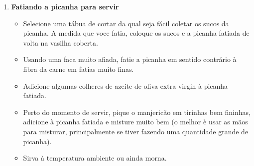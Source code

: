 \documentclass [11pt, letterpaper] {article}
\newcommand \fileName {SlicedGrilledBeef}
\begin{document}
\begin{description}
\begin{enumerate}
\begin{itemize}
	\end{itemize}
	\item {\bf Fatiando a picanha para servir}
	\begin{itemize}
        		\item Selecione uma t\'abua de cortar da qual seja f\'acil coletar os sucos da picanha. A medida que voce fatia, coloque os sucos e a picanha fatiada de volta na vasilha coberta.
		\item Usando uma faca muito afiada, fatie a picanha em sentido contr\'ario \`a fibra da carne em fatias muito finas. 
		\item Adicione algumas colheres de azeite de oliva extra virgin \`a picanha fatiada.
		\item Perto do momento de servir, pique o manjeric\~ao em tirinhas bem fininhas, adicione \`a picanha fatiada e misture muito bem (o melhor \`e usar as m\~aos para misturar, principalmente se tiver fazendo uma quantidade grande de picanha). 
		\item Sirva \`a temperatura ambiente ou ainda morna.
	\end{itemize}
     	\end{enumerate}         
\end{description}

\end{document}
